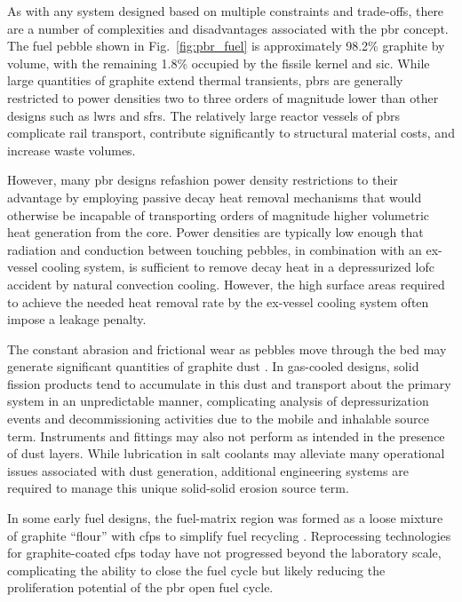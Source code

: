 As with any system designed based on multiple constraints and trade-offs, there are a number of complexities and disadvantages associated with the \gls{pbr} concept. The fuel pebble shown in Fig.\ \ref{fig:pbr_fuel} is approximately 98.2\% graphite by volume, with the remaining 1.8\% occupied by the fissile kernel and \gls{sic}. While large quantities of graphite extend thermal transients, \glspl{pbr} are generally restricted to power densities two to three orders of magnitude lower than other designs such as \glspl{lwr} and \glspl{sfr}. The relatively large reactor vessels of \glspl{pbr} complicate rail transport, contribute significantly to structural material costs, and increase waste volumes.

However, many \gls{pbr} designs refashion power density restrictions to their advantage by employing passive decay heat removal mechanisms that would otherwise be incapable of transporting orders of magnitude higher volumetric heat generation from the core. Power densities are typically low enough that radiation and conduction between touching pebbles, in combination with an ex-vessel cooling system, is sufficient to remove decay heat in a depressurized \gls{lofc} accident by natural convection cooling. However, the high surface areas required to achieve the needed heat removal rate by the ex-vessel cooling system often impose a leakage penalty.

The constant abrasion and frictional wear as pebbles move through the bed may generate significant quantities of graphite dust \cite{hecker,moormann}. In gas-cooled designs, solid fission products tend to accumulate in this dust and transport about the primary system in an unpredictable manner, complicating analysis of depressurization events and decommissioning activities due to the mobile and inhalable source term. Instruments and fittings may also not perform as intended in the presence of dust layers. While lubrication in salt coolants may alleviate many operational issues associated with dust generation, additional engineering systems are required to manage this unique solid-solid erosion source term.

In some early fuel designs, the fuel-matrix region was formed as a loose mixture of graphite ``flour'' with \glspl{cfp} to simplify fuel recycling \cite{claxton, hecker}. Reprocessing technologies for graphite-coated \glspl{cfp} today have not progressed beyond the laboratory scale, complicating the ability to close the fuel cycle \cite{moses} but likely reducing the proliferation potential of the \gls{pbr} open fuel cycle.

